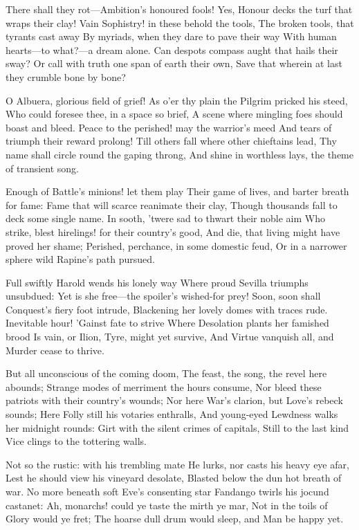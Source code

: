 \documentclass[10pt,twocolumn]{book}
\begin{document}
   There shall they rot---Ambition's honoured fools!
   Yes, Honour decks the turf that wraps their clay!
   Vain Sophistry! in these behold the tools,
   The broken tools, that tyrants cast away
   By myriads, when they dare to pave their way
   With human hearts---to what?---a dream alone.
   Can despots compass aught that hails their sway?
   Or call with truth one span of earth their own,
Save that wherein at last they crumble bone by bone?


   O Albuera, glorious field of grief!
   As o'er thy plain the Pilgrim pricked his steed,
   Who could foresee thee, in a space so brief,
   A scene where mingling foes should boast and bleed.
   Peace to the perished! may the warrior's meed
   And tears of triumph their reward prolong!
   Till others fall where other chieftains lead,
   Thy name shall circle round the gaping throng,
And shine in worthless lays, the theme of transient song.


   Enough of Battle's minions! let them play
   Their game of lives, and barter breath for fame:
   Fame that will scarce reanimate their clay,
   Though thousands fall to deck some single name.
   In sooth, 'twere sad to thwart their noble aim
   Who strike, blest hirelings! for their country's good,
   And die, that living might have proved her shame;
   Perished, perchance, in some domestic feud,
Or in a narrower sphere wild Rapine's path pursued.


   Full swiftly Harold wends his lonely way
   Where proud Sevilla triumphs unsubdued:
   Yet is she free---the spoiler's wished-for prey!
   Soon, soon shall Conquest's fiery foot intrude,
   Blackening her lovely domes with traces rude.
   Inevitable hour!  'Gainst fate to strive
   Where Desolation plants her famished brood
   Is vain, or Ilion, Tyre, might yet survive,
And Virtue vanquish all, and Murder cease to thrive.


   But all unconscious of the coming doom,
   The feast, the song, the revel here abounds;
   Strange modes of merriment the hours consume,
   Nor bleed these patriots with their country's wounds;
   Nor here War's clarion, but Love's rebeck sounds;
   Here Folly still his votaries enthralls,
   And young-eyed Lewdness walks her midnight rounds:
   Girt with the silent crimes of capitals,
Still to the last kind Vice clings to the tottering walls.


   Not so the rustic:  with his trembling mate
   He lurks, nor casts his heavy eye afar,
   Lest he should view his vineyard desolate,
   Blasted below the dun hot breath of war.
   No more beneath soft Eve's consenting star
   Fandango twirls his jocund castanet:
   Ah, monarchs! could ye taste the mirth ye mar,
   Not in the toils of Glory would ye fret;
The hoarse dull drum would sleep, and Man be happy yet.
\end{document}
